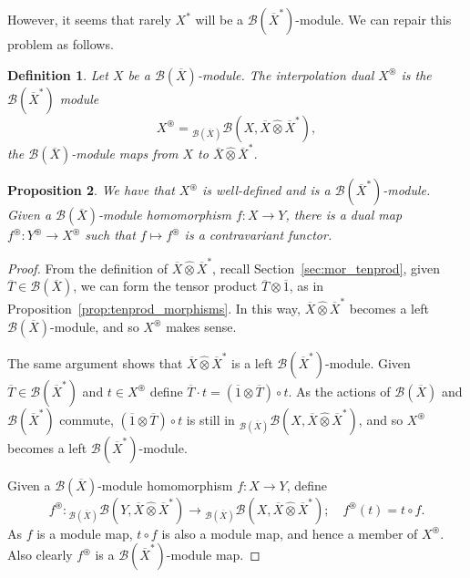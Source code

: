 \documentclass[a4paper,11pt]{article}
\theoremstyle{plain}
\newtheorem{proposition}{Proposition}[section]
\newtheorem{definition}[proposition]{Definition}
\theoremstyle{remark}
\newcommand{\mc}[1]{\mathcal{#1}}
\newcommand{\proten}{\widehat\otimes}
\newcommand{\intdual}{\circledast}
\begin{document}
However, it seems that rarely $X^*$ will be a $\mc B(\overline X^*)$-module.  We can repair this problem as follows.

\begin{definition}
Let $X$ be a $\mc B(\overline X)$-module.  The \emph{interpolation dual} $X^\intdual$ is the $\mc B(\overline X^*)$ module
\[ X^\intdual = {}_{\mc B(\overline X)}\mc B(X, \overline X \proten \overline X^*), \]
the $\mc B(\overline X)$-module maps from $X$ to $\overline X \proten \overline X^*$.
\end{definition}

\begin{proposition}
We have that $X^\intdual$ is well-defined and is a $\mc B(\overline X^*)$-module.  Given a $\mc B(\overline X)$-module homomorphism $f \colon X \to Y$, there is a dual map $f^\intdual \colon Y^\intdual \to X^\intdual$ such that $f\mapsto f^\intdual$ is a contravariant functor.
\end{proposition}
\begin{proof}
From the definition of $\overline X \proten \overline X^*$, recall Section~\ref{sec:mor_tenprod}, given $\overline T \in \mc B(\overline X)$, we can form the tensor product $\overline T \otimes \overline{1}$, as in Proposition~\ref{prop:tenprod_morphisms}.  In this way, $\overline X \proten \overline X^*$ becomes a left $\mc B(\overline X)$-module, and so $X^\intdual$ makes sense.

The same argument shows that $\overline X \proten \overline X^*$ is a left $\mc B(\overline X^*)$-module.  Given $\overline T\in\mc B(\overline X^*)$ and $t\in X^\intdual$ define $\overline T \cdot t = (\overline 1\otimes\overline T)\circ t$.  As the actions of $\mc B(\overline X)$ and $\mc B(\overline X^*)$ commute, $(\overline 1\otimes\overline T)\circ t$ is still in ${}_{\mc B(\overline X)}\mc B(X, \overline X \proten \overline X^*)$, and so $X^\intdual$ becomes a left $\mc B(\overline X^*)$-module.

Given a $\mc B(\overline X)$-module homomorphism $f \colon X \to Y$, define
\[ f^\intdual \colon {}_{\mc B(\overline X)}\mc B(Y, \overline X \proten \overline X^*) \to {}_{\mc B(\overline X)}\mc B(X, \overline X \proten \overline X^*); \quad
f^\intdual(t) = t \circ f. \]
As $f$ is a module map, $t\circ f$ is also a module map, and hence a member of $X^\intdual$.  Also clearly $f^\intdual$ is a $\mc B(\overline X^*)$-module map.
\end{proof}
\end{document}
